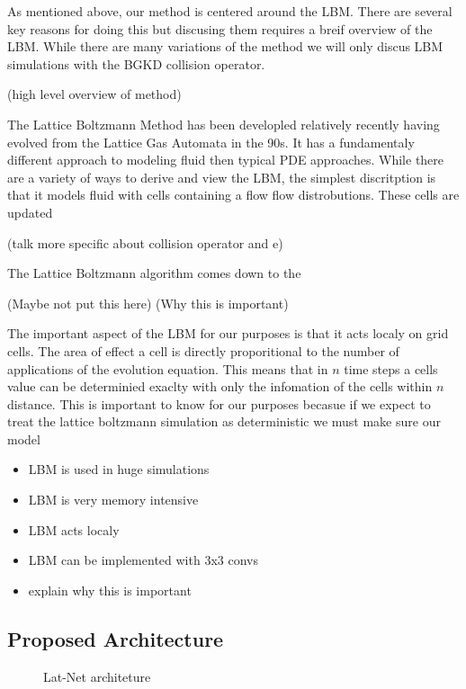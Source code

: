 \documentclass{article}
\begin{document}
As mentioned above, our method is centered around the LBM. There are several key reasons for doing this but discusing them requires a breif overview of the LBM. While there are many variations of the method we will only discus LBM simulations with the BGKD collision operator. 

(high level overview of method)

The Lattice Boltzmann Method has been developled relatively recently having evolved from the Lattice Gas Automata in the 90s. It has a fundamentaly different approach to modeling fluid then typical PDE approaches. While there are a variety of ways to derive and view the LBM, the simplest discritption is that it models fluid with cells containing a flow flow distrobutions. These cells are updated 

(talk more specific about collision operator and e)

The Lattice Boltzmann algorithm comes down to the 

(Maybe not put this here)
(Why this is important)

The important aspect of the LBM for our purposes is that it acts localy on grid cells. The area of effect a cell is directly proporitional to the number of applications of the evolution equation. This means that in $n$ time steps a cells value can be determinied exaclty with only the infomation of the cells within $n$ distance. This is important to know for our purposes becasue if we expect to treat the lattice boltzmann simulation as deterministic we must make sure our model 

\begin{itemize}
  \item LBM is used in huge simulations
  \item LBM is very memory intensive
  \item LBM acts localy
  \item LBM can be implemented with 3x3 convs
  \item explain why this is important
\end{itemize}

\subsection{Proposed Architecture}

\begin{figure}[!t]
\centering
{}
\caption{Lat-Net architeture }
\label{fig_1}
\end{figure}
\end{document}
